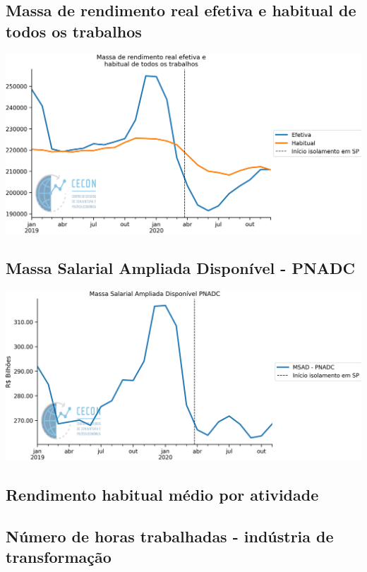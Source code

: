 \documentclass{SelfArx}
\begin{document}
\subsection*{Massa de rendimento real efetiva e habitual de todos os trabalhos}
\label{sec:org948bd78}

\begin{center}
\includegraphics[width=.9\linewidth]{./figs/Emprego/MRR_Efetiva_Habitual.png}
\end{center}

\subsection*{Massa Salarial Ampliada Disponível - PNADC}
\label{sec:org74622c6}

\begin{center}
\includegraphics[width=.9\linewidth]{./figs/Emprego/MSAD.png}
\end{center}

\subsection*{Rendimento habitual médio por atividade}
\label{sec:orgaaa4f0b}

\subsection*{Número de horas trabalhadas - indústria de transformação}
\label{sec:org9e3ba8f}
\end{document}

